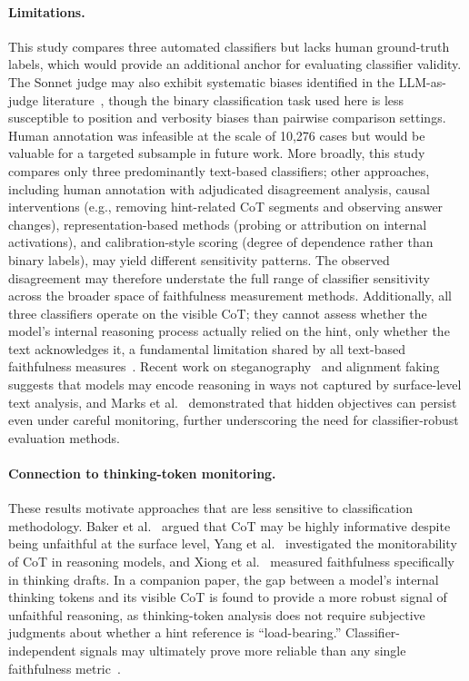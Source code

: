 \paragraph{Limitations.} This study compares three automated classifiers but lacks human ground-truth labels, which would provide an additional anchor for evaluating classifier validity. The Sonnet judge may also exhibit systematic biases identified in the LLM-as-judge literature~\cite{gu2024survey, ye2024justice}, though the binary classification task used here is less susceptible to position and verbosity biases than pairwise comparison settings. Human annotation was infeasible at the scale of 10,276 cases but would be valuable for a targeted subsample in future work. More broadly, this study compares only three predominantly text-based classifiers; other approaches, including human annotation with adjudicated disagreement analysis, causal interventions (e.g., removing hint-related CoT segments and observing answer changes), representation-based methods (probing or attribution on internal activations), and calibration-style scoring (degree of dependence rather than binary labels), may yield different sensitivity patterns. The observed disagreement may therefore understate the full range of classifier sensitivity across the broader space of faithfulness measurement methods. Additionally, all three classifiers operate on the visible CoT; they cannot assess whether the model's internal reasoning process actually relied on the hint, only whether the text acknowledges it, a fundamental limitation shared by all text-based faithfulness measures~\cite{arcuschin2025wild}. Recent work on steganography~\cite{roger2023steganography} and alignment faking~\cite{greenblatt2024alignment} suggests that models may encode reasoning in ways not captured by surface-level text analysis, and Marks et al.~\cite{marks2025auditing} demonstrated that hidden objectives can persist even under careful monitoring, further underscoring the need for classifier-robust evaluation methods.

\paragraph{Connection to thinking-token monitoring.} These results motivate approaches that are less sensitive to classification methodology. Baker et al.~\cite{baker2025cot} argued that CoT may be highly informative despite being unfaithful at the surface level, Yang et al.~\cite{yang2025monitorability} investigated the monitorability of CoT in reasoning models, and Xiong et al.~\cite{xiong2025thinking} measured faithfulness specifically in thinking drafts. In a companion paper, the gap between a model's internal thinking tokens and its visible CoT is found to provide a more robust signal of unfaithful reasoning, as thinking-token analysis does not require subjective judgments about whether a hint reference is ``load-bearing.'' Classifier-independent signals may ultimately prove more reliable than any single faithfulness metric~\cite{liu2025probing}.
